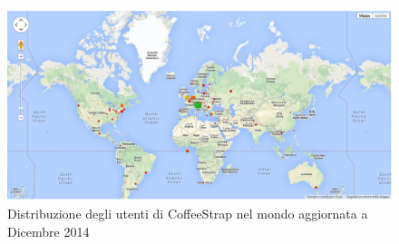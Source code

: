 \begin{figure}[htpd]
\centering
\includegraphics[width=\textwidth]{../immagini/user-distribution}
\caption{Distribuzione degli utenti di CoffeeStrap nel mondo aggiornata a Dicembre 2014}
\end{figure}
